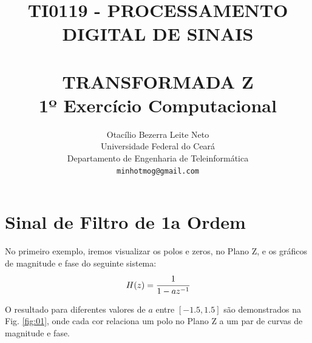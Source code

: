 \documentclass[a4paper,11pt]{article}
\title{ \normalsize \textsc{TI0119 - PROCESSAMENTO DIGITAL DE SINAIS} 
        \\[2.0cm]             
        \HRule{0.5pt} \\              
        \LARGE \textbf{\uppercase{Transformada Z}\\1º Exerc\'icio Computacional}
        \HRule{2pt} \\[0.5cm]  
}
\author{
        Otacílio Bezerra Leite Neto\\   
        Universidade Federal do Ceará\\  
        Departamento de Engenharia de Teleinform\'atica\\
        \texttt{minhotmog@gmail.com} \\
}
\makeatletter
\numberwithin{figure}{section}
\numberwithin{equation}{section}
\numberwithin{table}{section}
\theoremstyle{definition}
\def\printtitle{
    {\centering \@title\par}}
\def\printauthor{
    {\centering \large \@author}}
\makeatother
\begin{document}
\thispagestyle{empty}       %

\printtitle                 %
    \vfill
\printauthor                %
\newpage


\clearpage
\setcounter{page}{1}
\section{Sinal de Filtro de 1a Ordem}

No primeiro exemplo, iremos visualizar os polos e zeros, no Plano Z, e os gr\'aficos de magnitude e fase do seguinte sistema:
\begin{equation} \label{eq:first-system}
	H(z) = \cfrac{1}{1-a z^{-1}}
\end{equation}

O resultado para diferentes valores de $a$ entre $[-1.5, 1.5]$ s\~ao demonstrados na Fig. \ref{fig:01}, onde cada cor relaciona um polo no Plano Z a um par de curvas de magnitude e fase.
\end{document}
